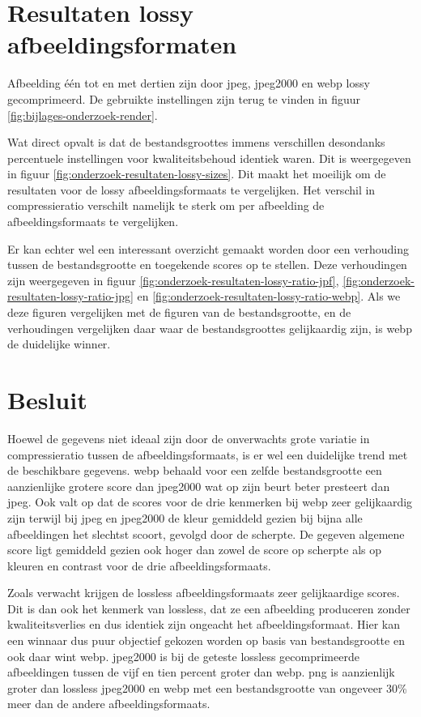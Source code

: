 \section{Resultaten lossy afbeeldingsformaten}
\label{sec:onderzoek-resultaten-lossy}

Afbeelding één tot en met dertien zijn door \gls{jpeg}, \gls{jpeg2000} en \gls{webp} \gls{lossy} gecomprimeerd. De gebruikte instellingen zijn terug te vinden in figuur \ref{fig:bijlages-onderzoek-render}.

Wat direct opvalt is dat de bestandsgroottes immens verschillen desondanks percentuele instellingen voor kwaliteitsbehoud identiek waren. Dit is weergegeven in figuur \ref{fig:onderzoek-resultaten-lossy-sizes}. Dit maakt het moeilijk om de resultaten voor de \gls{lossy} \glspl{afbeeldingsformaat} te vergelijken. Het verschil in \gls{compressieratio} verschilt namelijk te sterk om per afbeelding de \glspl{afbeeldingsformaat} te vergelijken. 

Er kan echter wel een interessant overzicht gemaakt worden door een verhouding tussen de bestandsgrootte en toegekende scores op te stellen. Deze verhoudingen zijn weergegeven in figuur \ref{fig:onderzoek-resultaten-lossy-ratio-jpf}, \ref{fig:onderzoek-resultaten-lossy-ratio-jpg} en \ref{fig:onderzoek-resultaten-lossy-ratio-webp}. Als we deze figuren vergelijken met de figuren van de bestandsgrootte, en de verhoudingen vergelijken daar waar de bestandsgroottes gelijkaardig zijn, is \gls{webp} de duidelijke winner.

\section{Besluit}
\label{sec:onderzoek-besluit}

Hoewel de gegevens niet ideaal zijn door de onverwachts grote variatie in compressieratio tussen de \glspl{afbeeldingsformaat}, is er wel een duidelijke trend met de beschikbare gegevens. \Gls{webp} behaald voor een zelfde bestandsgrootte een aanzienlijke grotere score dan \gls{jpeg2000} wat op zijn beurt beter presteert dan \gls{jpeg}. Ook valt op dat de scores voor de drie kenmerken bij \gls{webp} zeer gelijkaardig zijn terwijl bij \gls{jpeg} en \gls{jpeg2000} de kleur gemiddeld gezien bij bijna alle afbeeldingen het slechtst scoort, gevolgd door de scherpte. De gegeven algemene score ligt gemiddeld gezien ook hoger dan zowel de score op scherpte als op kleuren en contrast voor de drie \glspl{afbeeldingsformaat}.

Zoals verwacht krijgen de \gls{lossless} \glspl{afbeeldingsformaat} zeer gelijkaardige scores. Dit is dan ook het kenmerk van \gls{lossless}, dat ze een afbeelding produceren zonder kwaliteitsverlies en dus identiek zijn ongeacht het \gls{afbeeldingsformaat}. Hier kan een winnaar dus puur objectief gekozen worden op basis van bestandsgrootte en ook daar wint \gls{webp}. \Gls{jpeg2000} is bij de geteste \gls{lossless} gecomprimeerde afbeeldingen tussen de vijf en tien percent groter dan \gls{webp}. \Gls{png} is aanzienlijk groter dan \gls{lossless} \gls{jpeg2000} en \gls{webp} met een bestandsgrootte van ongeveer 30\% meer dan de andere \glspl{afbeeldingsformaat}.

